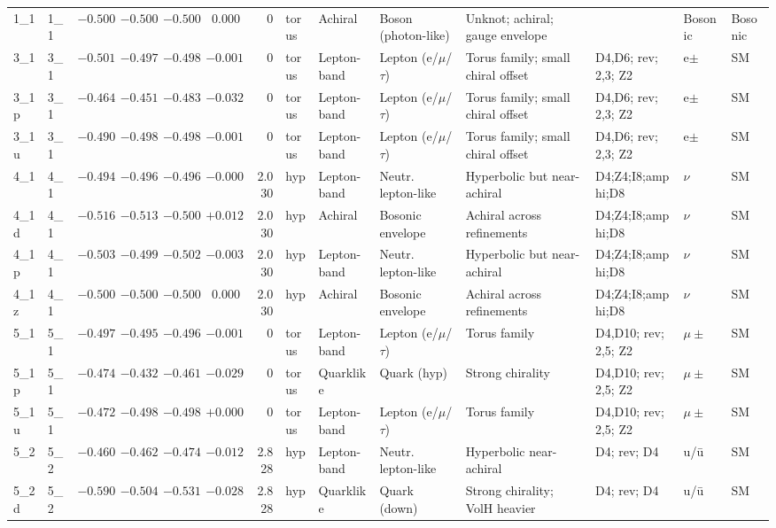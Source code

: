 \begin{landscape}
\begin{longtable}{@{}llrrrrrllp{3.2cm}lp{2.8cm}@{}}
1\_1 & 1\_1 & $-0.500$ & $-0.500$ & $-0.500$ & 0.000 & 0 & torus & Achiral & Boson (photon-like) & Unknot; achiral; gauge envelope & & Bosonic & Bosonic \\
3\_1 & 3\_1 & $-0.501$ & $-0.497$ & $-0.498$ & $-0.001$ & 0 & torus & Lepton-band & Lepton (e/$\mu$/$\tau$) & Torus family; small chiral offset & D4,D6; rev; 2,3; Z2 & e$\pm$ & SM \\
3\_1p & 3\_1 & $-0.464$ & $-0.451$ & $-0.483$ & $-0.032$ & 0 & torus & Lepton-band & Lepton (e/$\mu$/$\tau$) & Torus family; small chiral offset & D4,D6; rev; 2,3; Z2 & e$\pm$ & SM \\
3\_1u & 3\_1 & $-0.490$ & $-0.498$ & $-0.498$ & $-0.001$ & 0 & torus & Lepton-band & Lepton (e/$\mu$/$\tau$) & Torus family; small chiral offset & D4,D6; rev; 2,3; Z2 & e$\pm$ & SM \\
4\_1 & 4\_1 & $-0.494$ & $-0.496$ & $-0.496$ & $-0.0003$ & 2.030 & hyp & Lepton-band & Neutr. lepton-like & Hyperbolic but near-achiral & D4;Z4;I8;amphi;D8 & $\nu$ & SM \\
4\_1d & 4\_1 & $-0.516$ & $-0.513$ & $-0.500$ & $+0.012$ & 2.030 & hyp & Achiral & Bosonic envelope & Achiral across refinements & D4;Z4;I8;amphi;D8 & $\nu$ & SM \\
4\_1p & 4\_1 & $-0.503$ & $-0.499$ & $-0.502$ & $-0.003$ & 2.030 & hyp & Lepton-band & Neutr. lepton-like & Hyperbolic but near-achiral & D4;Z4;I8;amphi;D8 & $\nu$ & SM \\
4\_1z & 4\_1 & $-0.500$ & $-0.500$ & $-0.500$ & 0.000 & 2.030 & hyp & Achiral & Bosonic envelope & Achiral across refinements & D4;Z4;I8;amphi;D8 & $\nu$ & SM \\
5\_1 & 5\_1 & $-0.497$ & $-0.495$ & $-0.496$ & $-0.001$ & 0 & torus & Lepton-band & Lepton (e/$\mu$/$\tau$) & Torus family & D4,D10; rev; 2,5; Z2 & $\mu\pm$ & SM \\
5\_1p & 5\_1 & $-0.474$ & $-0.432$ & $-0.461$ & $-0.029$ & 0 & torus & Quarklike & Quark (hyp) & Strong chirality & D4,D10; rev; 2,5; Z2 & $\mu\pm$ & SM \\
5\_1u & 5\_1 & $-0.472$ & $-0.498$ & $-0.498$ & $+0.0002$ & 0 & torus & Lepton-band & Lepton (e/$\mu$/$\tau$) & Torus family & D4,D10; rev; 2,5; Z2 & $\mu\pm$ & SM \\
5\_2 & 5\_2 & $-0.460$ & $-0.462$ & $-0.474$ & $-0.012$ & 2.828 & hyp & Lepton-band & Neutr. lepton-like & Hyperbolic near-achiral & D4; rev; D4 & u/ū & SM \\
5\_2d & 5\_2 & $-0.590$ & $-0.504$ & $-0.531$ & $-0.028$ & 2.828 & hyp & Quarklike & Quark (down) & Strong chirality; VolH heavier & D4; rev; D4 & u/ū & SM \\

\end{longtable}
\end{landscape}
